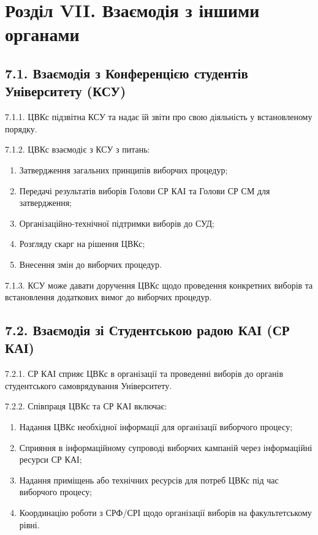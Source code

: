 \section*{Розділ VII. Взаємодія з іншими органами}

\subsection*{7.1. Взаємодія з Конференцією студентів Університету (КСУ)}
    7.1.1. ЦВКс підзвітна КСУ та надає їй звіти про свою діяльність у встановленому порядку.

    7.1.2. ЦВКс взаємодіє з КСУ з питань:

        \begin{enumerate}[label=\alph*)]
            \item Затвердження загальних принципів виборчих процедур;
            \item Передачі результатів виборів Голови СР КАІ та Голови СР СМ для затвердження;
            \item Організаційно-технічної підтримки виборів до СУД;
            \item Розгляду скарг на рішення ЦВКс;
            \item Внесення змін до виборчих процедур.
        \end{enumerate}

    7.1.3. КСУ може давати доручення ЦВКс щодо проведення конкретних виборів та встановлення додаткових вимог до виборчих процедур.

\subsection*{7.2. Взаємодія зі Студентською радою КАІ (СР КАІ)}
    7.2.1. СР КАІ сприяє ЦВКс в організації та проведенні виборів до органів студентського самоврядування Університету.

    7.2.2. Співпраця ЦВКс та СР КАІ включає:

        \begin{enumerate}[label=\alph*)]
            \item Надання ЦВКс необхідної інформації для організації виборчого процесу;
            \item Сприяння в інформаційному супроводі виборчих кампаній через інформаційні ресурси СР КАІ;
            \item Надання приміщень або технічних ресурсів для потреб ЦВКс під час виборчого процесу;
            \item Координацію роботи з СРФ/СРІ щодо організації виборів на факультетському рівні.
        \end{enumerate}

